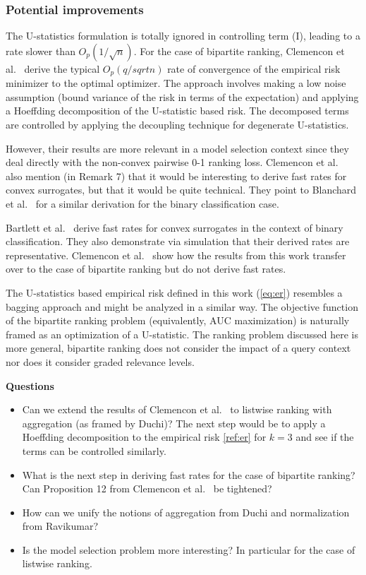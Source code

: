 \documentclass[a4paper,10pt]{article}
\begin{document}
\subsubsection{Potential improvements}
The U-statistics formulation is totally ignored in controlling term
(I), leading to a rate slower than \(O_p(1/\sqrt n)\). For the case of
bipartite ranking, Clemencon et
al.~\cite{clemencon-2008-ranking-rates} derive the typical \(O_p(q/sqrt n)\) rate of
convergence of the empirical risk minimizer to the optimal
optimizer. The approach involves making a low noise assumption (bound
variance of the risk in terms of the expectation) and applying a
Hoeffding decomposition of the U-statistic based risk. The decomposed
terms are controlled by applying the decoupling technique for
degenerate U-statistics.

However, their results are more relevant in a
model selection context since they deal directly with the non-convex
pairwise 0-1 ranking loss. Clemencon et
al.~\cite{clemencon-2008-ranking-rates} also mention (in Remark 7)
that it would be interesting to derive fast rates for convex
surrogates, but that it would be quite technical. They point to
Blanchard et al.~\cite{blanchard-2003-rates} for a similar derivation
for the binary classification case.

Bartlett et al.~\cite{bartlett-2006-risk} derive fast rates for convex
surrogates in the context of binary classification. They also
demonstrate via simulation that their derived rates are
representative. Clemencon et al.~\cite{clemencon-2008-ranking-rates}
show how the results from this work transfer over to the case of
bipartite ranking but do not derive fast rates.

The U-statistics based empirical risk defined in this work
(\ref{eq:er}) resembles a bagging approach and might be analyzed in a
similar way. The objective function of the bipartite ranking problem
\cite{clemencon-2008-ranking-rates} (equivalently, AUC maximization)
is naturally framed as an optimization of a U-statistic. The ranking
problem discussed here is more general, bipartite ranking does not
consider the impact of a query context nor does it consider graded
relevance levels.

\textbf{Questions}

\begin{itemize}
  \item Can we extend the results of Clemencon et al.~\cite{clemencon-2008-ranking-rates} to listwise ranking with aggregation (as framed by Duchi)? The next step would be to apply a Hoeffding decomposition to the empirical risk \ref{ref:er} for \(k=3\) and see if the terms can be controlled similarly.
  \item What is the next step in deriving fast rates for the case of bipartite ranking? Can Proposition 12 from Clemencon et al.~\cite{clemencon-2008-ranking-rates} be tightened?
  \item How can we unify the notions of aggregation from Duchi and normalization from Ravikumar?
  \item Is the model selection problem more interesting? In particular for the case of listwise ranking.
\end{itemize}

{}
\end{document}
